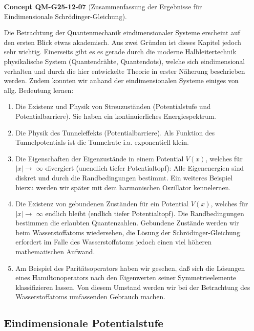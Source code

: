 \documentclass[10pt, letterpaper]{article}
\newcommand{\CustomHeading}[3]{%
  \par\medskip\noindent%
  \textbf{#1 #2} \textnormal{(#3)}.\enskip%
}
\newenvironment{CONC}[2]{\CustomHeading{Concept}{#1}{#2}}{}
\begin{document}
\begin{CONC}{QM-G25-12-07}{Zusammenfassung der Ergebnisse für Eindimensionale Schrödinger-Gleichung}
Die Betrachtung der Quantenmechanik eindimensionaler Systeme erscheint auf den ersten Blick etwas akademisch. Aus zwei Gründen ist dieses Kapitel jedoch sehr wichtig. Einerseits gibt es es gerade durch die moderne Halbleitertechnik physikalische System (Quantendrähte, Quantendots), welche sich eindimensional verhalten und durch die hier entwickelte Theorie in erster Näherung beschrieben werden. Zudem konnten wir anhand der eindimensionalen Systeme einiges von allg. Bedeutung lernen:

\begin{enumerate}
  \item Die Existenz und Physik von Streuzuständen (Potentialstufe und Potentialbarriere). Sie haben ein kontinuierliches Energiespektrum.
  \item Die Physik des Tunneleffekts (Potentialbarriere). Als Funktion des Tunnelpotentials ist die Tunnelrate i.a. exponentiell klein.
  \item Die Eigenschaften der Eigenzustände in einem Potential $V(x)$, welches für $|x| \rightarrow$ $\infty$ divergiert (unendlich tiefer Potentialtopf): Alle Eigenenergien sind diskret und durch die Randbedingungen bestimmt. Ein weiteres Beispiel hierzu werden wir später mit dem harmonischen Oszillator kennelernen.
  \item Die Existenz von gebundenen Zuständen für ein Potential $V(x)$, welches für $|x| \rightarrow$ $\infty$ endlich bleibt (endlich tiefer Potentialtopf). Die Randbedingungen bestimmen die erlaubten Quantenzahlen. Gebundene Zustände werden wir beim Wasserstoffatoms wiedersehen, die Lösung der Schrödinger-Gleichung erfordert im Falle des Wasserstoffatoms jedoch einen viel höheren mathematischen Aufwand.
  \item Am Beispiel des Paritätsoperators haben wir gesehen, daß sich die Lösungen eines Hamiltonoperators nach den Eigenwerten seiner Symmetrieelemente klassifizieren lassen. Von diesem Umstand werden wir bei der Betrachtung des Wasserstoffatoms umfassenden Gebrauch machen.
\end{enumerate}
\end{CONC}

\subsection{Eindimensionale Potentialstufe}
\end{document}
